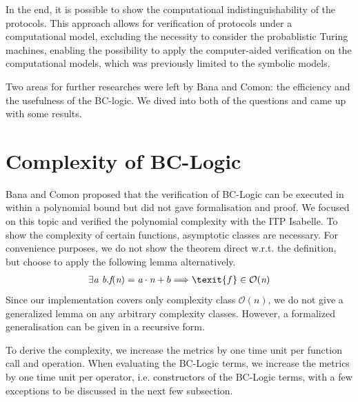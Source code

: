 \documentclass[conference]{IEEEtran}
\begin{document}
In the end, it is possible to show the computational indistinguishability of the protocols. This approach allows for verification of protocols under a computational model, excluding the necessity to consider the probablistic Turing machines, enabling the possibility to apply the computer-aided verification on the computational models, which was previously limited to the symbolic models. 

Two areas for further researches were left by Bana and Comon: the efficiency  and the usefulness of the BC-logic. We dived into both of the questions and came up with some results. \cite{BC-logic}

\section{Complexity of BC-Logic}
Bana and Comon proposed that the verification of BC-Logic can be executed in within a polynomial bound but did not gave formalisation and proof. We focused on this topic and verified the polynomial complexity with the ITP Isabelle. To show the complexity of certain functions, asymptotic classes are necessary. For convenience purposes, we do not show the theorem direct w.r.t. the definition, but choose to apply the following lemma alternatively.
\begin{align}
     \exists\textit{a b}. \textit{f}(\textit{n}) = \textit{a} \cdot \textit{n} + b \Longrightarrow \texit{f} \in \mathcal{O}(\textit{n}) \nonumber
\end{align}
Since our implementation covers only complexity class $\mathcal{O}(\textit{n})$, we do not give a generalized lemma on any arbitrary complexity classes. However, a formalized generalisation can be given in a recursive form.

To derive the complexity, we increase the metrics by one time unit per function call and operation. When evaluating the BC-Logic terms, we increase the metrics by one time unit per operator, i.e. constructors of the BC-Logic terms, with a few exceptions to be discussed in the next few subsection.
\end{document}
